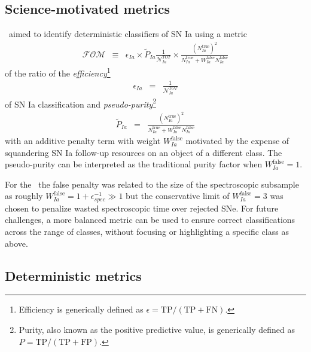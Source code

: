 \subsection{Science-motivated metrics}
\label{sec:science}


\snphotcc\ aimed to identify deterministic classifiers of SN Ia using a metric
\begin{eqnarray}
  \label{eq:snphotccfom}
  \mathcal{FOM} &\equiv& \epsilon_{Ia} \times \tilde{P}_{Ia}
  \frac{1}{\mathcal{N}_{Ia}^{TOT}}\times \frac{(N_{Ia}^{\mathrm{true}})^2}{N_{Ia}^\mathrm{true}+W_{Ia}^\mathrm{false}N_{Ia}^\mathrm{false}}
\end{eqnarray}
of the ratio of the \textit{efficiency}\footnote{Efficiency is generically defined as $\epsilon = \mathrm{TP} / (\mathrm{TP} + \mathrm{FN})$.}
\begin{eqnarray}
  \label{eq:efficiency}
  \epsilon_{Ia} &=& \frac{1}{\mathcal{N}_{Ia}^{TOT}}
\end{eqnarray}
of SN Ia classification and \textit{pseudo-purity}\footnote{Purity, also known as the positive predictive value, is generically defined as $P = \mathrm{TP} / (\mathrm{TP} + \mathrm{FP})$.}
\begin{eqnarray}
  \label{eq:pseudopurity}
  \tilde{P}_{Ia} &=& \frac{(N_{Ia}^{\mathrm{true}})^2} {N_{Ia}^\mathrm{true} + W_{Ia}^\mathrm{false}N_{Ia}^\mathrm{false}}
\end{eqnarray}
with an additive penalty term with weight $W_{Ia}^\mathrm{false}$ motivated by the expense of squandering SN Ia follow-up resources on an object of a different class.
The pseudo-purity can be interpreted as the traditional purity factor when $W_{Ia}^\mathrm{false} = 1$.

For the \snphotcc\ the false penalty was related to the size of the spectroscopic subsample as roughly $W_{Ia}^\mathrm{false} = 1 + \epsilon_{spec}^{-1} \gg 1$ but the conservative limit of $W_{Ia}^\mathrm{false} = 3$ was chosen to penalize wasted spectroscopic time over rejected SNe.
For future challenges, a more balanced metric can be used to ensure correct classifications across the range of classes, without focusing or highlighting a specific class as above.

\subsection{Deterministic metrics}
\label{sec:deterministic}

